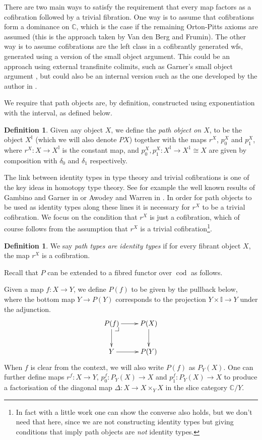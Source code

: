 \documentclass[a4paper]{amsart}
\makeatletter
\theoremstyle{definition}
\newtheorem{definition}[theorem]{Definition}
\newcommand{\pullbackcorner}[1][dr]{\save*!/#1-1.2pc/#1:(-1,1)@^{|-}\restore}
\newcommand{\cat}[1]{\mathbb{#1}}
\newcommand{\catc}{\cat{C}}
\newcommand{\cod}{\operatorname{cod}}
\newcommand{\intv}{\mathbb{I}}
\makeatother
\begin{document}
There are two main ways to satisfy the requirement that every map
factors as a cofibration followed by a trivial fibration. One way is
to assume that cofibrations form a dominance on $\catc$, which is the
case if the remaining Orton-Pitts axioms are assumed (this is the
approach taken by Van den Berg and Frumin). The other way is to assume
cofibrations are the left class in a cofibrantly generated wfs,
generated using a version of the small object argument. This could be
an approach using external transfinite colimits, such as Garner's
small object argument \cite{garnersmallobject}, but could also be an
internal version such as the one developed by the author in
\cite{swanwtypered}.

We require that path objects are, by definition, constructed using
exponentiation with the interval, as defined below.
\begin{definition}
  Given any object $X$, we define the \emph{path object on $X$}, to be
  the object $X^\intv$ (which we will also denote $PX$) together with
  the maps $r^X$, $p^X_0$ and $p^X_1$, where
  $r^X \colon X \to X^\intv$ is the constant map, and
  $p_0^X, p_1^X \colon X^\intv \to X^1 \cong X$ are given by
  composition with $\delta_0$ and $\delta_1$ respectively.
\end{definition}

The link between identity types in type theory and trivial cofibrations
is one of the key ideas in homotopy type theory. See for example the
well known results of Gambino and Garner in \cite{gambinogarner} or
Awodey and Warren in \cite{awodeywarren}. In order for path objects to
be used as identity types along these lines it is necessary for $r^X$
to be a trivial cofibration. We focus on the condition that $r^X$ is
just a cofibration, which of course follows from the assumption that
$r^X$ is a trivial cofibration\footnote{In fact with a little work
  one can show the converse also holds, but we don't need that here,
  since we are not constructing identity types but giving conditions
  that imply path objects are \emph{not} identity types.}.
\begin{definition}
  We say \emph{path types are identity types} if for every fibrant
  object $X$, the map $r^X$ is a cofibration.
\end{definition}

Recall that $P$ can be extended to a fibred functor over $\cod$ as
follows.

Given a map $f \colon X \to Y$, we define $P(f)$ to be given by the
pullback below, where the bottom map $Y \to P(Y)$ corresponds to the
projection $Y \times \intv \to Y$ under the adjunction.
\begin{equation*}
  \xymatrix{ P(f) \pullbackcorner \ar[r] \ar[d] & P(X) \ar[d] \\
    Y \ar[r] & P(Y)}
\end{equation*}
When $f$ is clear from the context, we will also write $P(f)$ as
$P_Y(X)$. One can further define maps $r^f \colon X \to Y$,
$p_0^f \colon P_Y(X) \to X$ and $p_1^f \colon P_Y(X) \to X$ to produce
a factorisation of the diagonal map $\Delta \colon X \to X \times_Y X$
in the slice category $\catc/Y$.
\end{document}

